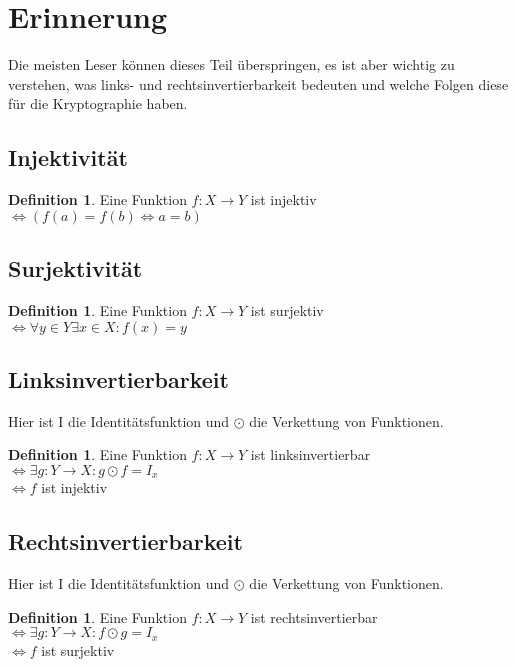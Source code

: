 \documentclass[12pt,a4paper]{article}
\theoremstyle{definition}
\newtheorem{definition}[theorem]{Definition}
\begin{document}
    \section{Erinnerung}

    Die meisten Leser können dieses Teil überspringen, es ist aber wichtig zu verstehen, was links- und
    rechtsinvertierbarkeit bedeuten und welche Folgen diese für die Kryptographie haben.

    \subsection{Injektivität}

    \begin{definition}
        Eine Funktion $f: X \longrightarrow Y$ ist injektiv \\
        $\Leftrightarrow (f(a) = f(b) \Leftrightarrow a = b)$
    \end{definition}

    \subsection{Surjektivität}

    \begin{definition}
        Eine Funktion $f: X \longrightarrow Y$ ist surjektiv \\
        $\Leftrightarrow \forall y \in Y \exists x \in X: f(x) = y$
    \end{definition}

    \subsection{Linksinvertierbarkeit}
    Hier ist I die Identitätsfunktion und $\odot$ die Verkettung von Funktionen.
    \begin{definition}
        Eine Funktion $f: X \longrightarrow Y$ ist linksinvertierbar \\
        $\Leftrightarrow \exists g: Y \longrightarrow X: g \odot f = I_x$ \\
        $\Leftrightarrow f$ ist injektiv
    \end{definition}

    \subsection{Rechtsinvertierbarkeit}
    Hier ist I die Identitätsfunktion und $\odot$ die Verkettung von Funktionen.
    \begin{definition}
        Eine Funktion $f: X \longrightarrow Y$ ist rechtsinvertierbar \\
        $\Leftrightarrow \exists g: Y \longrightarrow X: f \odot g = I_x$ \\
        $\Leftrightarrow f$ ist surjektiv
    \end{definition}
\end{document}
